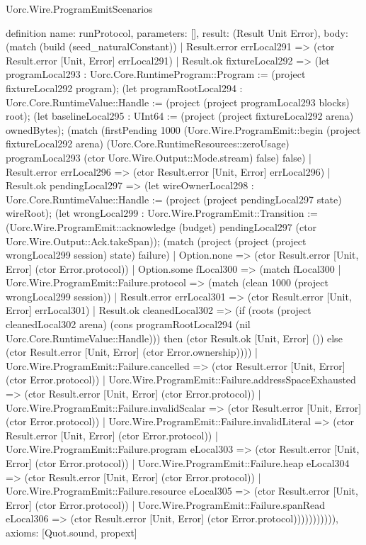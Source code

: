 \begin{lexlean}{Uorc.Wire.ProgramEmitScenarios}
\begin{semanticmodule}
definition{
  name: runProtocol,
  parameters: [],
  result: (Result Unit Error),
  body: (match (build (seed_naturalConstant))
    | Result.error errLocal291 => (ctor Result.error [Unit, Error] errLocal291)
    | Result.ok fixtureLocal292 => (let programLocal293 : Uorc.Core.RuntimeProgram::Program := (project fixtureLocal292 program); (let programRootLocal294 : Uorc.Core.RuntimeValue::Handle := (project (project programLocal293 blocks) root); (let baselineLocal295 : UInt64 := (project (project fixtureLocal292 arena) ownedBytes); (match (firstPending 1000 (Uorc.Wire.ProgramEmit::begin (project fixtureLocal292 arena) (Uorc.Core.RuntimeResources::zeroUsage) programLocal293 (ctor Uorc.Wire.Output::Mode.stream) false) false)
      | Result.error errLocal296 => (ctor Result.error [Unit, Error] errLocal296)
      | Result.ok pendingLocal297 => (let wireOwnerLocal298 : Uorc.Core.RuntimeValue::Handle := (project (project pendingLocal297 state) wireRoot); (let wrongLocal299 : Uorc.Wire.ProgramEmit::Transition := (Uorc.Wire.ProgramEmit::acknowledge (budget) pendingLocal297 (ctor Uorc.Wire.Output::Ack.takeSpan)); (match (project (project (project wrongLocal299 session) state) failure)
        | Option.none => (ctor Result.error [Unit, Error] (ctor Error.protocol))
        | Option.some fLocal300 => (match fLocal300
          | Uorc.Wire.ProgramEmit::Failure.protocol => (match (clean 1000 (project wrongLocal299 session))
            | Result.error errLocal301 => (ctor Result.error [Unit, Error] errLocal301)
            | Result.ok cleanedLocal302 => (if (roots (project cleanedLocal302 arena) (cons programRootLocal294 (nil Uorc.Core.RuntimeValue::Handle))) then (ctor Result.ok [Unit, Error] ()) else (ctor Result.error [Unit, Error] (ctor Error.ownership))))
          | Uorc.Wire.ProgramEmit::Failure.cancelled => (ctor Result.error [Unit, Error] (ctor Error.protocol))
          | Uorc.Wire.ProgramEmit::Failure.addressSpaceExhausted => (ctor Result.error [Unit, Error] (ctor Error.protocol))
          | Uorc.Wire.ProgramEmit::Failure.invalidScalar => (ctor Result.error [Unit, Error] (ctor Error.protocol))
          | Uorc.Wire.ProgramEmit::Failure.invalidLiteral => (ctor Result.error [Unit, Error] (ctor Error.protocol))
          | Uorc.Wire.ProgramEmit::Failure.program eLocal303 => (ctor Result.error [Unit, Error] (ctor Error.protocol))
          | Uorc.Wire.ProgramEmit::Failure.heap eLocal304 => (ctor Result.error [Unit, Error] (ctor Error.protocol))
          | Uorc.Wire.ProgramEmit::Failure.resource eLocal305 => (ctor Result.error [Unit, Error] (ctor Error.protocol))
          | Uorc.Wire.ProgramEmit::Failure.spanRead eLocal306 => (ctor Result.error [Unit, Error] (ctor Error.protocol))))))))))),
  axioms: [Quot.sound, propext]
}


\end{semanticmodule}
\end{lexlean}
